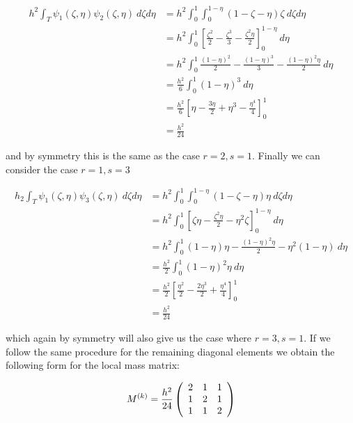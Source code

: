 \begin{align*}
    h^2\int_T\psi_1(\zeta,\eta)\psi_2(\zeta,\eta)\ d\zeta d\eta
    &=  h^2\int_0^1\int_0^{1-\eta}(1 - \zeta -\eta)\zeta\ d\zeta d\eta \\
    &= h^2\int_0^1\left[\frac{\zeta^2}{2} -\frac{\zeta^3}{3}
                        -\frac{\zeta^2\eta}{2}\right]_0^{1-\eta}\  d\eta \\
    &= h^2\int_0^1\frac{(1-\eta)^2}{2} - \frac{(1-\eta)^3}{3}- \frac{(1-\eta)^2\eta}{2}\ d\eta \\
    &= \frac{h^2}{6}\int_0^1(1- \eta)^3\ d\eta \\
    &= \frac{h^2}{6}\left[\eta -\frac{3\eta}{2} + \eta^3 - \frac{\eta^4}{4}\right]_0^1 \\
    &= \frac{h^2}{24}
\end{align*}

and by symmetry this is the same as the case $r = 2, s = 1$. Finally we can consider the case
$r = 1, s = 3$

\begin{align*}
    h_2\int_T\psi_1(\zeta, \eta)\psi_3(\zeta, \eta)\ d\zeta d\eta
    &= h^2\int_0^1\int_0^{1-\eta}(1 - \zeta - \eta)\eta\ d\zeta d\eta \\
    &= h^2\int_0^1\left[\zeta\eta - \frac{\zeta^2\eta}{2} - \eta^2\zeta\right]_0^{1-\eta}\ d\eta \\
    &= h^2\int_0^1(1-\eta)\eta - \frac{(1 - \eta)^2\eta}{2} - \eta^2(1 - \eta)\ d\eta \\
    &= \frac{h^2}{2}\int_0^1(1 - \eta)^2\eta \ d\eta \\
    &= \frac{h^2}{2}\left[\frac{\eta^2}{2} - \frac{2\eta^3}{2} + \frac{\eta^4}{4}\right]_0^1 \\
    &= \frac{h^2}{24}
\end{align*}

which again by symmetry will also give us the case where $r = 3, s = 1$. If we
follow the same procedure for the remaining diagonal elements we obtain the
following form for the local mass matrix:

\begin{equation}\label{eq:twod-local-mass}
    M^{(k)} =
    \frac{h^2}{24}\left(\begin{array}{c c c}
         2 &  1 &  1 \\
         1 &  2 &  1 \\
         1 &  1 &  2
      \end{array}\right)
\end{equation}

